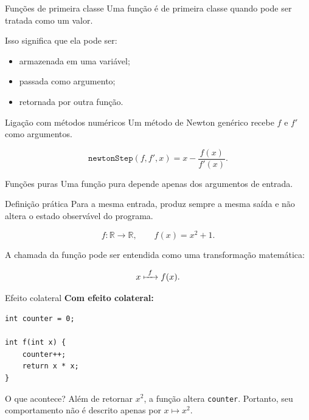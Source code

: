 \documentclass[aspectratio=169,11pt]{beamer}
\begin{document}
\begin{frame}{Funções de primeira classe}
  Uma função é de primeira classe quando pode ser tratada como um valor.

  \vspace{0.2cm}
  Isso significa que ela pode ser:

  \begin{itemize}
    \item armazenada em uma variável;
    \item passada como argumento;
    \item retornada por outra função.
  \end{itemize}

  \begin{exampleblock}{Ligação com métodos numéricos}
    Um método de Newton genérico recebe $f$ e $f'$ como argumentos.
  \end{exampleblock}

  \begin{equation*}
    \texttt{newtonStep}(f,f',x)
    =
    x-\frac{f(x)}{f'(x)}.
  \end{equation*}
\end{frame}

\begin{frame}{Funções puras}
  Uma função pura depende apenas dos argumentos de entrada.

  \begin{block}{Definição prática}
    Para a mesma entrada, produz sempre a mesma saída e não altera o estado observável do programa.
  \end{block}

  \begin{equation}\label{eq:funcao-pura}
    f:\mathbb{R}\longrightarrow\mathbb{R},
    \qquad
    f(x)=x^2+1.
  \end{equation}

  \vspace{0.15cm}
  A chamada da função pode ser entendida como uma transformação matemática:

  \begin{equation*}
    x\xmapsto{\ f\ }f(x).
  \end{equation*}
\end{frame}

\begin{frame}[fragile]{Efeito colateral}
  \textbf{Com efeito colateral:}

  \begin{lstlisting}
int counter = 0;

int f(int x) {
    counter++;
    return x * x;
}
  \end{lstlisting}

  \begin{alertblock}{O que acontece?}
    Além de retornar $x^2$, a função altera \texttt{counter}. Portanto,
    seu comportamento não é descrito apenas por $x\mapsto x^2$.
  \end{alertblock}
\end{frame}
\end{document}
